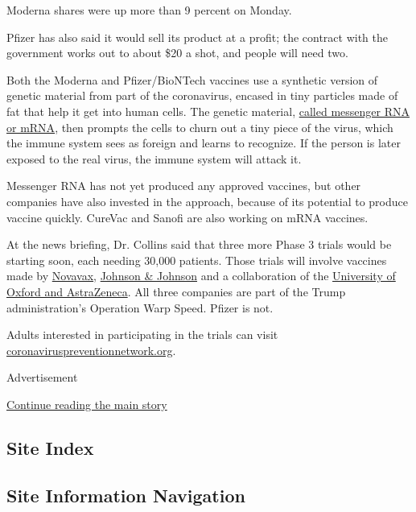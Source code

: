 Moderna shares were up more than 9 percent on Monday.

Pfizer has also said it would sell its product at a profit; the contract
with the government works out to about \$20 a shot, and people will need
two.

Both the Moderna and Pfizer/BioNTech vaccines use a synthetic version of
genetic material from part of the coronavirus, encased in tiny particles
made of fat that help it get into human cells. The genetic material,
\href{https://www.nytimes.com/interactive/2020/05/20/science/coronavirus-vaccine-development.html}{called
messenger RNA or mRNA}, then prompts the cells to churn out a tiny piece
of the virus, which the immune system sees as foreign and learns to
recognize. If the person is later exposed to the real virus, the immune
system will attack it.

Messenger RNA has not yet produced any approved vaccines, but other
companies have also invested in the approach, because of its potential
to produce vaccine quickly. CureVac and Sanofi are also working on mRNA
vaccines.

At the news briefing, Dr. Collins said that three more Phase 3 trials
would be starting soon, each needing 30,000 patients. Those trials will
involve vaccines made by
\href{https://www.nytimes.com/2020/07/16/health/coronavirus-vaccine-novavax.html}{Novavax},
\href{https://www.nytimes.com/2020/07/17/health/coronavirus-vaccine-johnson-janssen.html}{Johnson
\& Johnson} and a collaboration of the
\href{https://www.nytimes.com/2020/07/20/world/covid-coronavirus-vaccine.html}{University
of Oxford and AstraZeneca}. All three companies are part of the Trump
administration's Operation Warp Speed. Pfizer is not.

Adults interested in participating in the trials can visit
\href{https://www.coronaviruspreventionnetwork.org/}{coronaviruspreventionnetwork.org}.

Advertisement

\protect\hyperlink{after-bottom}{Continue reading the main story}

\hypertarget{site-index}{%
\subsection{Site Index}\label{site-index}}

\hypertarget{site-information-navigation}{%
\subsection{Site Information
Navigation}\label{site-information-navigation}}

